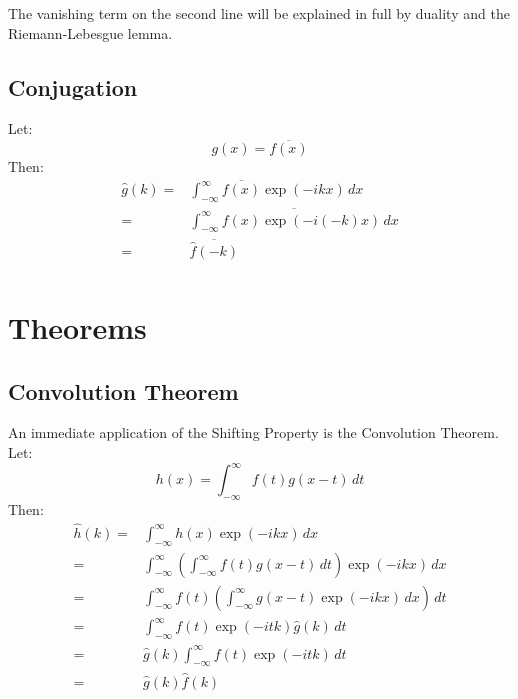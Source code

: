 The vanishing term on the second line will be explained in full by duality and the Riemann-Lebesgue lemma.

\subsection{Conjugation}
Let:
\[g(x) = \overline{f(x)}\]
Then:
\begin{equation*}
\begin{aligned}
	\hat{g}(k) =& \int_{-\infty}^{\infty}\overline{f(x)}\exp(-ikx)\,dx\\
	=& \overline{\int_{-\infty}^{\infty}f(x)\exp(-i(-k)x)\,dx}\\
	=& \overline{\hat{f}(-k)} \\
\end{aligned}
\end{equation*}

\section{Theorems}
\subsection{Convolution Theorem}
An immediate application of the Shifting Property is the Convolution Theorem.
Let:
\[h(x) = \int_{-\infty}^{\infty}f(t)g(x-t)\,dt\]
Then:
\begin{equation*}
\begin{aligned}
\hat{h}(k) =& \int_{-\infty}^{\infty}h(x)\exp(-ikx)\,dx\\
=& \int_{-\infty}^{\infty}\left(\int_{-\infty}^{\infty}f(t)g(x-t)\,dt\right)\exp(-ikx)\,dx\\
=& \int_{-\infty}^{\infty}f(t)\left(\int_{-\infty}^{\infty}g(x-t)\exp(-ikx)\,dx\right)\,dt\\
=& \int_{-\infty}^{\infty}f(t)\exp(-itk)\hat{g}(k)\,dt\\
=& \hat{g}(k)\int_{-\infty}^{\infty}f(t)\exp(-itk)\,dt\\
=& \hat{g}(k)\hat{f}(k)\\
\end{aligned}
\end{equation*}

